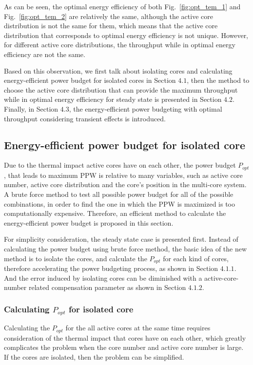 As can be seen, the optimal energy efficiency of both Fig.~\ref{fig:opt_tem_1} and Fig.~\ref{fig:opt_tem_2} are relatively the same, although the active core distribution is not the same for them, which means that the active core distribution that corresponds to optimal energy efficiency is not unique. However, for different active core distributions, the throughput while in optimal energy efficiency are not the same.

Based on this observation, we first talk about isolating cores and calculating energy-efficient power budget for isolated cores in Section $4.1$, then the method to choose the active core distribution that can provide the maximum throughput while in optimal energy efficiency for steady state is presented in Section $4.2$. Finally, in Section $4.3$, the energy-efficient power budgeting with optimal throughput considering transient effects is introduced.


\subsection{Energy-efficient power budget for isolated core}
Due to the thermal impact active cores have on each other, the power budget $P_{opt}$, that leads to maximum PPW is relative to many variables, such as active core number, active core distribution and the core's position in the multi-core system. A brute force method to test all possible power budget for all of the possible combinations, in order to find the one in which the PPW is maximized is too computationally expensive. Therefore, an efficient method to calculate the energy-efficient power budget is proposed in this section.

For simplicity consideration, the steady state case is presented first. Instead of calculating the power budget using brute force method, the basic idea of the new method is to isolate the cores, and calculate the $P_{opt}$ for each kind of cores, therefore accelerating the power budgeting process, as shown in Section $4.1.1$. And the error induced by isolating cores can be diminished with a active-core-number related compensation parameter as shown in Section $4.1.2$.


\subsubsection{Calculating $P_{opt}$ for isolated core}
Calculating the $P_{opt}$ for the all active cores at the same time requires consideration of the thermal impact that cores have on each other, which greatly complicates the problem when the core number and active core number is large. If the cores are isolated, then the problem can be simplified.


